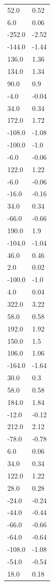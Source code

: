 \begin{longtable}{ll}
52.0 & 0.52 \\
6.0 & 0.06 \\
-252.0 & -2.52 \\
-144.0 & -1.44 \\
136.0 & 1.36 \\
134.0 & 1.34 \\
90.0 & 0.9 \\
-4.0 & -0.04 \\
34.0 & 0.34 \\
172.0 & 1.72 \\
-108.0 & -1.08 \\
-100.0 & -1.0 \\
-6.0 & -0.06 \\
122.0 & 1.22 \\
-6.0 & -0.06 \\
-16.0 & -0.16 \\
34.0 & 0.34 \\
-66.0 & -0.66 \\
190.0 & 1.9 \\
-104.0 & -1.04 \\
46.0 & 0.46 \\
2.0 & 0.02 \\
-100.0 & -1.0 \\
4.0 & 0.04 \\
322.0 & 3.22 \\
58.0 & 0.58 \\
192.0 & 1.92 \\
150.0 & 1.5 \\
106.0 & 1.06 \\
-164.0 & -1.64 \\
30.0 & 0.3 \\
58.0 & 0.58 \\
184.0 & 1.84 \\
-12.0 & -0.12 \\
212.0 & 2.12 \\
-78.0 & -0.78 \\
6.0 & 0.06 \\
34.0 & 0.34 \\
122.0 & 1.22 \\
28.0 & 0.28 \\
-24.0 & -0.24 \\
-44.0 & -0.44 \\
-66.0 & -0.66 \\
-64.0 & -0.64 \\
-108.0 & -1.08 \\
-54.0 & -0.54 \\
18.0 & 0.18 \\

\end{longtable}
